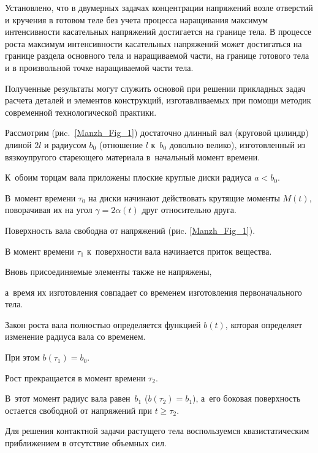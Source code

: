 Установлено, что в двумерных задачах концентрации напряжений возле отверстий и кручения в готовом теле без учета процесса наращивания максимум интенсивности касательных напряжений достигается на границе тела. В процессе роста максимум интенсивности касательных напряжений может достигаться на границе раздела основного тела и наращиваемой части, на границе готового тела и в произвольной точке наращиваемой части тела.

Полученные результаты могут служить основой при решении прикладных задач расчета деталей и элементов конструкций, изготавливаемых при помощи методик современной технологической  практики.



\newpage




Рассмотрим (риc.~\ref{Manzh_Fig_1}) достаточно длинный вал (круговой цилиндр) длиной $ 2l $ и радиусом $ b_0 $ (отношение $ l $ к~$ b_0 $ довольно велико), изготовленный из вязкоупругого стареющего материала в~начальный момент времени. 

К~обоим торцам вала приложены плоские круглые диски радиуса $ a <b_0 $. 

В~момент времени $ \tau_0 $ на диски начинают действовать крутящие моменты $ M (t) $, поворачивая  их на угол $ \gamma = 2\alpha (t) $  друг относительно друга. 

Поверхность вала свободна от напряжений (риc. \ref{Manzh_Fig_1}).



В момент времени $\tau_1$ к~поверхности вала начинается приток вещества. 

Вновь присоединяемые элементы также не напряжены, 

а~время их изготовления совпадает со временем изготовления первоначального тела.



Закон роста вала полностью определяется функцией $b(t)$, которая определяет изменение радиуса вала со временем. 

При этом $b(\tau_1)=b_0$.



Рост прекращается в момент времени $\tau_2$. 

В~этот момент радиус вала равен~$b_1$ ($b(\tau_2)=b_1$), а~его боковая поверхность остается свободной от напряжений при $t\geq\tau_2$. 

Для решения контактной задачи растущего тела воспользуемся квазистатическим приближением в отсутствие объемных сил.



